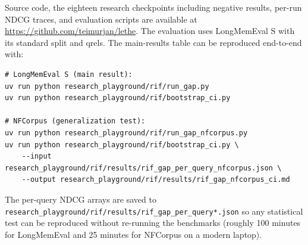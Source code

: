 \documentclass[11pt,a4paper]{article}
\begin{document}
Source code, the eighteen research checkpoints including negative results, per-run NDCG traces, and evaluation scripts are available at \url{https://github.com/teimurjan/lethe}. The evaluation uses LongMemEval S with its standard split and qrels. The main-results table can be reproduced end-to-end with:
\begin{verbatim}
# LongMemEval S (main result):
uv run python research_playground/rif/run_gap.py
uv run python research_playground/rif/bootstrap_ci.py

# NFCorpus (generalization test):
uv run python research_playground/rif/run_gap_nfcorpus.py
uv run python research_playground/rif/bootstrap_ci.py \
    --input  research_playground/rif/results/rif_gap_per_query_nfcorpus.json \
    --output research_playground/rif/results/rif_gap_nfcorpus_ci.md
\end{verbatim}
The per-query NDCG arrays are saved to \texttt{research\_playground/rif/results/rif\_gap\_per\_query*.json} so any statistical test can be reproduced without re-running the benchmarks (roughly 100 minutes for LongMemEval and 25 minutes for NFCorpus on a modern laptop).
\end{document}
